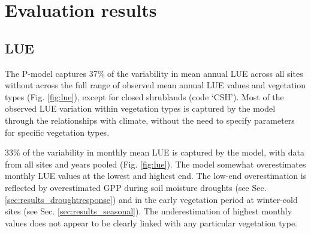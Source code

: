 \documentclass{myreport}
\begin{document}
\section{Evaluation results}
\label{sec:results}

\subsection{LUE}

The P-model captures 37\% of the variability in mean annual LUE across all sites without across the full range of observed mean annual LUE values and vegetation types (Fig. \ref{fig:lue}), except for closed shrublands (code `CSH'). Most of the observed LUE variation within vegetation types is captured by the model through the relationships with climate, without the need to specify parameters for specific vegetation types. 

33\% of the variability in monthly mean LUE is captured by the model, with data from all sites and years pooled (Fig. \ref{fig:lue}). The model somewhat overestimates monthly LUE values at the lowest and highest end. The low-end overestimation is reflected by overestimated GPP during soil moisture droughts (see Sec. \ref{sec:results_droughtresponse}) and in the early vegetation period at winter-cold sites (see Sec. \ref{sec:results_seasonal}). The underestimation of highest monthly values does not appear to be clearly linked with any particular vegetation type.
\end{document}
